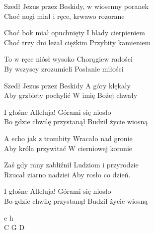 \begin{text}
    Szedł Jezus przez Beskidy, w wiosenny poranek\\
    Choć nogi miał i ręce, krwawo rozorane

    Choć bok miał opuchnięty I blady cierpieniem\\
    Choć trzy dni leżał ciężkim Przybity kamieniem

    To w ręce niósł wysoko Chorągiew radości\\
    By wszyscy zrozumieli Posłanie miłości

    Szedł Jezus przez Beskidy A góry klękały\\
    Aby grzbiety pochylić W imię Bożej chwały

    \vin I głośne Alleluja! Górami się niosło\\
    \vin Bo gdzie chwilę przystanął Budził życie wiosną

    A echo jak z trombity Wracało nad gronie\\
    Aby króla przywitać W cierniowej koronie

    Zaś gdy rany zabliźnił Ludziom i przyrodzie\\
    Rzucał ziarno nadziei Aby rosło co dzień.

    \vin I głośne Alleluja! Górami się niosło\\
    \vin Bo gdzie chwilę przystanął Budził życie wiosną
\end{text}
\begin{chord}
    e h\\
	C G D
\end{chord}